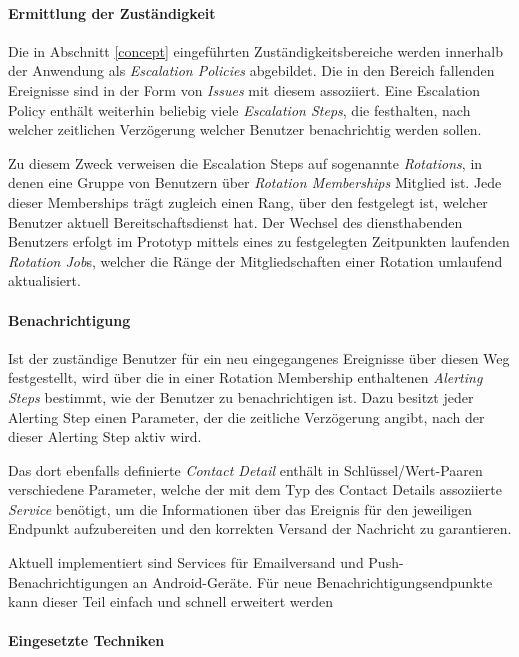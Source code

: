\documentclass[11pt,utf8,notoc,bibnum,german,final]{zihpub}
\begin{document}
\paragraph{Ermittlung der Zuständigkeit}

Die in Abschnitt \ref{concept} eingeführten Zuständigkeitsbereiche werden
innerhalb der Anwendung als \emph{Escalation Policies} abgebildet. Die in den
Bereich fallenden Ereignisse sind in der Form von \emph{Issues} mit diesem
assoziiert. Eine Escalation Policy enthält weiterhin beliebig viele
\emph{Escalation Steps}, die festhalten, nach welcher zeitlichen Verzögerung
welcher Benutzer benachrichtig werden sollen.

Zu diesem Zweck verweisen die Escalation Steps auf sogenannte \emph{Rotations},
in denen eine Gruppe von Benutzern über \emph{Rotation Memberships} Mitglied
ist. Jede dieser Memberships trägt zugleich einen Rang, über den festgelegt
ist, welcher Benutzer aktuell Bereitschaftsdienst hat. Der Wechsel des
diensthabenden Benutzers erfolgt im Prototyp mittels eines zu festgelegten
Zeitpunkten laufenden \emph{Rotation Job}s, welcher die Ränge der
Mitgliedschaften einer Rotation umlaufend aktualisiert.

\paragraph{Benachrichtigung}

Ist der zuständige Benutzer für ein neu eingegangenes Ereignisse über diesen
Weg festgestellt, wird über die in einer Rotation Membership enthaltenen
\emph{Alerting Steps} bestimmt, wie der Benutzer zu benachrichtigen ist. Dazu
besitzt jeder Alerting Step einen Parameter, der die zeitliche Verzögerung
angibt, nach der dieser Alerting Step aktiv wird.

Das dort ebenfalls definierte \emph{Contact Detail} enthält in
Schlüssel/Wert-Paaren verschiedene Parameter, welche der mit dem Typ des
Contact Details assoziierte \emph{Service} benötigt, um die Informationen über
das Ereignis für den jeweiligen Endpunkt aufzubereiten und den korrekten
Versand der Nachricht zu garantieren.

Aktuell implementiert sind Services für Emailversand und
Push-Benachrichtigungen an Android-Geräte. Für neue Benachrichtigungsendpunkte
kann dieser Teil einfach und schnell erweitert werden


\paragraph{Eingesetzte Techniken}
\end{document}
